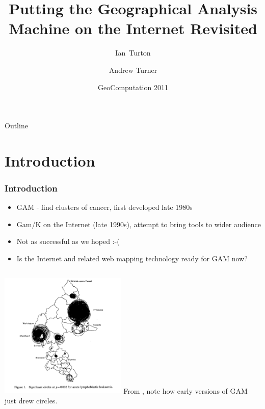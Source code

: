 \documentclass{beamer}
\title[GAM Revisited] %
{Putting the Geographical Analysis Machine on the Internet Revisited}
\author[Turton, Turner] %
{Ian~Turton\inst{1} \and Andrew Turner\inst{2}}
\institute[ ] %
{
  \inst{1}%
Independent Researcher\\
 ijturton@gmail.com
  \and
  \inst{2}%
  Centre for Computational Geography\\
  University of Leeds\\
  A.G.D.Turner@leeds.ac.uk}
\date[ ] %
{GeoComputation 2011}
\begin{document}
\begin{frame}
  \titlepage
\end{frame}

\begin{frame}{Outline}
  \tableofcontents
\end{frame}


\section{Introduction}
\begin{frame}[t]
\frametitle{Introduction}
\begin{itemize}
\item GAM - find clusters of cancer, first developed late 1980s
\item Gam/K on the Internet (late 1990s), attempt to bring tools to wider audience
\item Not as successful as we hoped :-(
\item Is the Internet and related web mapping technology ready for GAM now?
\end{itemize}
\end{frame}
\begin{frame}
\begin{columns}
\includegraphics[height=6.0cm]{first_gam.png}
From \citet{citeulike:5207314}, note how early versions of GAM just drew circles.
\end{columns}
\end{frame}
\end{document}
